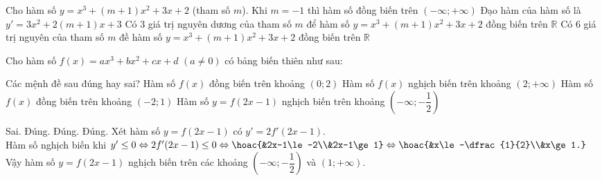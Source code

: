 \begin{ex}%
Cho hàm số $y=x^3+(m+1) x^2+3x+2$ (tham số $m$).
\choiceTF
{\True Khi $m=-1$ thì hàm số đồng biến trên $(-\infty;+\infty)$}
{\True Đạo hàm của hàm số là $y'=3x^2+2(m+1) x+3$}
{Có $3$ giá trị nguyên dương của tham số $m$ để hàm số $y=x^3+(m+1) x^2+3x+2$ đồng biến trên $\mathbb{R}$}
{Có $6$ giá trị nguyên của tham số $m$ đề hàm số $y=x^3+(m+1) x^2+3x+2$ đồng biến trên $\mathbb{R}$}
\end{ex}
\begin{ex}%
Cho hàm số $f(x)=ax^3+bx^2+cx+d$ $(a \neq 0)$ có bảng biến thiên như sau:
\begin{center}
\end{center}
Các mệnh đề sau đúng hay sai?
\choiceTF
{Hàm số $f(x)$ đồng biến trên khoảng $(0; 2)$}
{\True Hàm số $f(x)$ nghịch biến trên khoảng $(2;+\infty)$}
{\True Hàm số $f(x)$ đồng biến trên khoảng $(-2; 1)$}
{\True Hàm số $y=f(2x-1)$ nghịch biến trên khoảng $\left(-\infty;-\dfrac{1}{2}\right)$}
\loigiai
{
\begin{itemchoice}
	\itemch Sai.
	\itemch Đúng.
	\itemch Đúng.
	\itemch Đúng. Xét hàm số $y=f(2x-1)$ có $y'=2f'(2x-1)$.\\
	Hàm số nghịch biến khi $y'\le 0\Leftrightarrow2f'(2x-1)\le 0\Leftrightarrow\hoac{&2x-1\le -2\\&2x-1\ge 1}\Leftrightarrow\hoac{&x\le-\dfrac{1}{2}\\&x\ge 1.}$
	Vậy hàm số $y=f(2x-1)$ nghịch biến trên các khoảng $\left(-\infty;-\dfrac{1}{2}\right)$ và $(1;+\infty)$.
\end{itemchoice}
}
\end{ex}


